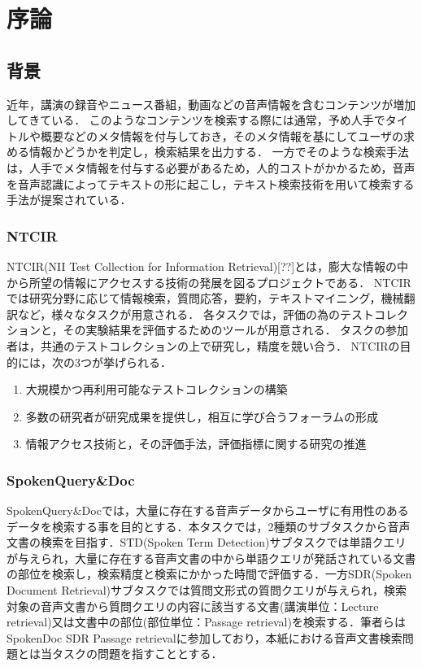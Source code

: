 ﻿%

\chapter{序論} %
\section{背景}
近年，講演の録音やニュース番組，動画などの音声情報を含むコンテンツが増加してきている．
このようなコンテンツを検索する際には通常，予め人手でタイトルや概要などのメタ情報を付与しておき，そのメタ情報を基にしてユーザの求める情報かどうかを判定し，検索結果を出力する．
一方でそのような検索手法は，人手でメタ情報を付与する必要があるため，人的コストがかかるため，音声を音声認識によってテキストの形に起こし，テキスト検索技術を用いて検索する手法が提案されている．


\subsection{NTCIR}
NTCIR(NII Test Collection for Information Retrieval)[??]とは，膨大な情報の中から所望の情報にアクセスする技術の発展を図るプロジェクトである．
NTCIRでは研究分野に応じて情報検索，質問応答，要約，テキストマイニング，機械翻訳など，様々なタスクが用意される．
各タスクでは，評価の為のテストコレクションと，その実験結果を評価するためのツールが用意される．
タスクの参加者は，共通のテストコレクションの上で研究し，精度を競い合う．
NTCIRの目的には，次の3つが挙げられる．
\begin{enumerate}
    \item 大規模かつ再利用可能なテストコレクションの構築
    \item 多数の研究者が研究成果を提供し，相互に学び合うフォーラムの形成
    \item 情報アクセス技術と，その評価手法，評価指標に関する研究の推進
\end{enumerate}

\subsection{SpokenQuery\&Doc}
SpokenQuery\&Docでは，大量に存在する音声データからユーザに有用性のあるデータを検索する事を目的とする．本タスクでは，2種類のサブタスクから音声文書の検索を目指す．STD(Spoken Term Detection)サブタスクでは単語クエリが与えられ，大量に存在する音声文書の中から単語クエリが発話されている文書の部位を検索し，検索精度と検索にかかった時間で評価する．一方SDR(Spoken Document Retrieval)サブタスクでは質問文形式の質問クエリが与えられ，検索対象の音声文書から質問クエリの内容に該当する文書(講演単位：Lecture retrieval)又は文書中の部位(部位単位：Passage retrieval)を検索する．筆者らはSpokenDoc SDR Passage retrievalに参加しており，本紙における音声文書検索問題とは当タスクの問題を指すこととする．

